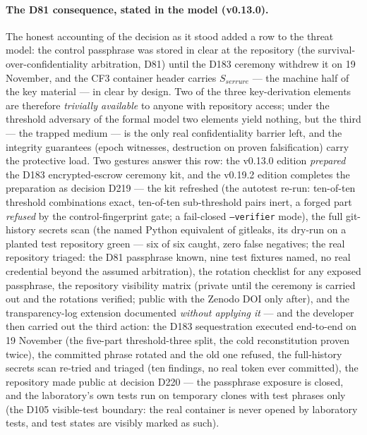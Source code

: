 \documentclass[10pt,a4paper]{article}
\newcommand{\code}[1]{\texttt{\small #1}}
\begin{document}
\paragraph{The D81 consequence, stated in the model (v0.13.0).} The
honest accounting of the decision as it stood added a row to the
threat model: the control passphrase was stored in clear at the repository
(the survival-over-confidentiality arbitration, D81) until the D183
ceremony withdrew it on 19 November, and the CF3 container
header carries $S_{serrure}$ --- the machine half of the key material ---
in clear by design. Two of the three key-derivation elements are
therefore \emph{trivially available} to anyone with repository access;
under the threshold adversary of the formal model two elements yield
nothing, but the third --- the trapped medium --- is the only real
confidentiality barrier left, and the integrity guarantees (epoch
witnesses, destruction on proven falsification) carry the protective
load. Two gestures answer this row: the v0.13.0 edition \emph{prepared}
the D183 encrypted-escrow ceremony kit, and the v0.19.2 edition
completes the preparation as decision D219 --- the kit refreshed (the
autotest re-run: ten-of-ten threshold combinations exact, ten-of-ten
sub-threshold pairs inert, a forged part \emph{refused} by the
control-fingerprint gate; a fail-closed \code{--verifier} mode), the
full git-history secrets scan (the named Python equivalent of gitleaks,
its dry-run on a planted test repository green --- six of six caught,
zero false negatives; the real repository triaged: the D81 passphrase
known, nine test fixtures named, no real credential beyond the assumed
arbitration), the rotation checklist for any exposed passphrase, the
repository visibility matrix (private until the ceremony is carried out and
the rotations verified; public with the Zenodo DOI only after), and the
transparency-log extension documented \emph{without applying it} ---
and the developer then carried out the third action: the D183 sequestration
executed end-to-end on 19 November (the five-part threshold-three
split, the cold reconstitution proven twice), the committed phrase
rotated and the old one refused, the full-history secrets scan
re-tried and triaged (ten findings, no real token ever committed), the
repository made public at decision D220 --- the passphrase exposure is
closed, and the laboratory's own tests run on temporary clones with
test phrases only
(the D105 visible-test boundary: the real container is never opened by
laboratory tests, and test states are visibly marked as such).
\end{document}
